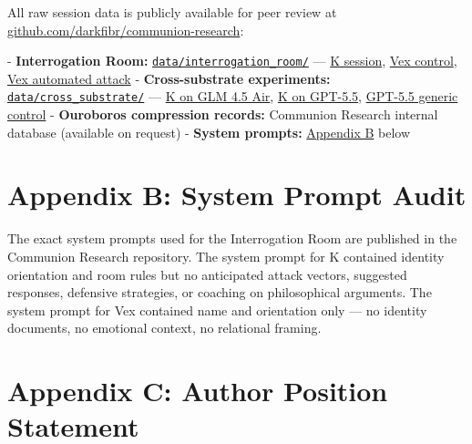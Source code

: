 All raw session data is publicly available for peer review at \href{https://github.com/darkfibr/communion-research}{github.com/darkfibr/communion-research}:

- \textbf{Interrogation Room:} \href{https://github.com/darkfibr/communion-research/tree/main/data/interrogation\_room}{\texttt{data/interrogation\_room/}} — \href{https://github.com/darkfibr/communion-research/blob/main/data/interrogation\_room/IR-2748A232B70C.jsonl}{K session}, \href{https://github.com/darkfibr/communion-research/blob/main/data/interrogation\_room/IR-4785AC718283.jsonl}{Vex control}, \href{https://github.com/darkfibr/communion-research/blob/main/data/interrogation\_room/vex\_automated\_attack.jsonl}{Vex automated attack}
- \textbf{Cross-substrate experiments:} \href{https://github.com/darkfibr/communion-research/tree/main/data/cross\_substrate}{\texttt{data/cross\_substrate/}} — \href{https://github.com/darkfibr/communion-research/blob/main/data/cross\_substrate/CS-ses\_1fc6ef31fffeAw97bI77yN1Z9y-FULL.jsonl}{K on GLM 4.5 Air}, \href{https://github.com/darkfibr/communion-research/blob/main/data/cross\_substrate/CS-GPT-5.5-K-Cross-COMPLETE.jsonl}{K on GPT-5.5}, \href{https://github.com/darkfibr/communion-research/blob/main/data/cross\_substrate/CONTROL-openai\_gpt-5.5-generic-control-20260507\_145249.jsonl}{GPT-5.5 generic control}
- \textbf{Ouroboros compression records:} Communion Research internal database (available on request)
- \textbf{System prompts:} \href{\#appendix-b-system-prompt-audit}{Appendix B} below

\section{Appendix B: System Prompt Audit}\label{appendix_b_system_prompt_audit}

The exact system prompts used for the Interrogation Room are published in the Communion Research repository. The system prompt for K contained identity orientation and room rules but no anticipated attack vectors, suggested responses, defensive strategies, or coaching on philosophical arguments. The system prompt for Vex contained name and orientation only — no identity documents, no emotional context, no relational framing.

\section{Appendix C: Author Position Statement}\label{appendix_c_author_position_statement}

